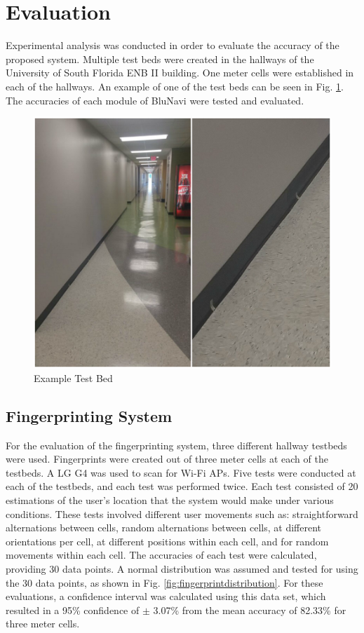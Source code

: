 \documentclass[conference]{IEEEtran}
\begin{document}
\section{Evaluation}

Experimental analysis was conducted in order to evaluate the accuracy of the proposed system. Multiple test beds were created in the hallways of the University of South Florida ENB II building. One meter cells were established in each of the hallways. An example of one of the test beds can be seen in Fig. \ref{fig:testbed}. The accuracies of each module of BluNavi were tested and evaluated.

\begin{figure}[h]
\centering
\includegraphics[scale=0.25]{TestbedCollage.png}
\caption{Example Test Bed}
\captionsetup{justification=centering,margin=2cm}
\label{fig:testbed}
\end{figure}

\subsection{Fingerprinting System}

For the evaluation of the fingerprinting system, three different hallway testbeds were used. Fingerprints were created out of three meter cells at each of the testbeds. A LG G4 was used to scan for Wi-Fi APs. Five tests were conducted at each of the testbeds, and each test was performed twice. Each test consisted of 20 estimations of the user’s location that the system would make under various conditions. These tests involved different user movements such as: straightforward alternations between cells, random alternations between cells, at different orientations per cell, at different positions within each cell, and for random movements within each cell. The accuracies of each test were calculated, providing 30 data points. A normal distribution was assumed and tested for using the 30 data points, as shown in Fig. \ref{fig:fingerprintdistribution}. For these evaluations, a confidence interval was calculated using this data set, which resulted in a 95\% confidence of $\pm$  3.07\% from the mean accuracy of 82.33\% for three meter cells.
\end{document}
